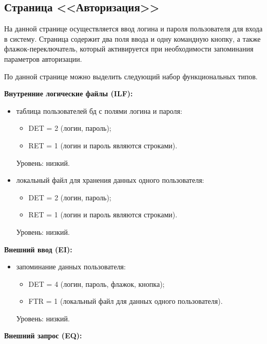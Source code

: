 \documentclass{bmstu}
\begin{document}
\clearpage

\subsection*{Страница <<Авторизация>>}


На данной странице осуществляется ввод логина и пароля пользователя для
входа в систему. Страница содержит два поля ввода и одну командную кнопку, а также флажок-переключатель, который активируется при необходимости запоминания параметров авторизации. 

По данной странице можно выделить следующий набор функциональных типов.

\textbf{Внутренние логические файлы (ILF):}

\begin{itemize}
    \item таблица пользователей бд с полями логина и пароля:
    \begin{itemize}
        \item DET = 2 (логин, пароль);
        \item RET = 1 (логин и пароль являются строками).
    \end{itemize}
    Уровень: низкий.

    \item локальный файл для хранения данных одного пользователя:
    \begin{itemize}
        \item DET = 2 (логин, пароль);
        \item RET = 1 (логин и пароль являются строками).
    \end{itemize}
    Уровень: низкий.
\end{itemize}

\textbf{Внешний ввод (EI):}

\begin{itemize}
    \item запоминание данных пользователя:
    \begin{itemize}
        \item DET = 4 (логин, пароль, флажок, кнопка);
        \item FTR = 1 (локальный файл для данных одного пользователя).
    \end{itemize}
    Уровень: низкий.
\end{itemize}

\textbf{Внешний запрос (EQ):}
\end{document}

